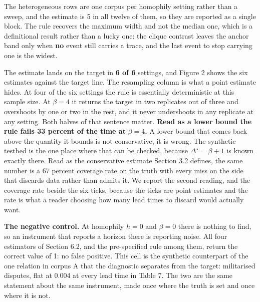 \documentclass[twoside,11pt]{article}
\begin{document}
The heterogeneous rows are one corpus per homophily setting rather than a sweep, and the estimate is 5 in all twelve of them, so they are reported as a single block. The rule recovers the maximum width and not the median one, which is a definitional result rather than a lucky one: the clique contrast leaves the anchor band only when \textbf{no} event still carries a trace, and the last event to stop carrying one is the widest.

The estimate lands on the target in \textbf{6 of 6} settings, and Figure 2 shows the six estimates against the target line. The resampling column is what a point estimate hides. At four of the six settings the rule is essentially deterministic at this sample size. At \(\beta = 4\) it returns the target in two replicates out of three and overshoots by one or two in the rest, and it never undershoots in any replicate at any setting. Both halves of that sentence matter. \textbf{Read as a lower bound the rule fails 33 percent of the time at} \(\beta = 4\)\textbf{.} A lower bound that comes back above the quantity it bounds is not conservative, it is wrong. The synthetic testbed is the one place where that can be checked, because \(\Delta^{\star} = \beta + 1\) is known exactly there. Read as the conservative estimate Section 3.2 defines, the same number is a 67 percent coverage rate on the truth with every miss on the side that discards data rather than admits it. We report the second reading, and the coverage rate beside the six ticks, because the ticks are point estimates and the rate is what a reader choosing how many lead times to discard would actually want.

\textbf{The negative control.} At homophily \(h = 0\) and \(\beta = 0\) there is nothing to find, so an instrument that reports a horizon there is reporting noise. All four estimators of Section 6.2, and the pre-specified rule among them, return the correct value of 1: no false positive. This cell is the synthetic counterpart of the one relation in corpus A that the diagnostic separates from the target: militarised disputes, flat at 0.004 at every lead time in Table 7. The two are the same statement about the same instrument, made once where the truth is set and once where it is not.
\end{document}
